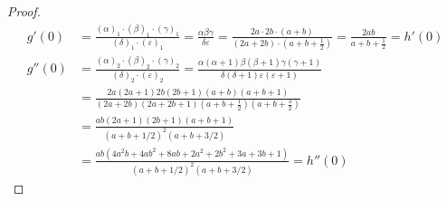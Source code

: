 \begin{proof}
\begin{align*}
        g'(0)&=\frac{(\alpha)_1\cdot(\beta)_1\cdot(\gamma)_1}{(\delta)_1 \cdot (\varepsilon)_1} = \frac{\alpha\beta\gamma}{\delta\varepsilon}=\frac{2a\cdot2b\cdot(a+b)}{(2a+2b)\cdot\left(a+b+\frac 1 2\right)}= \frac{2 ab} {a+b+\frac 1 2}=h'(0)\\
        g''(0)&=\frac{(\alpha)_2\cdot(\beta)_2\cdot(\gamma)_2}{(\delta)_2 \cdot (\varepsilon)_2}
        = \frac{\alpha(\alpha+1)\beta(\beta+1)\gamma(\gamma+1)}{\delta(\delta+1)\varepsilon(\varepsilon+1)}\\
        &= \frac{2a(2a+1)2b(2b+1)(a+b)(a+b+1)}{(2a+2b)(2a+2b+1)\left(a+b+\frac 1 2\right)\left(a+b+\frac 3 2\right)}\\
        &= \frac{ab(2a+1)(2b+1)(a+b+1)}{(a+b+1/2)^2(a+b+3/2)}\\
        &=\frac{ab(4a^2b+4ab^2+8ab+2a^2+2b^2+3a+3b+1)}{(a+b+1/2)^2(a+b+3/2)}=h''(0)
    \end{align*}
\end{proof}


